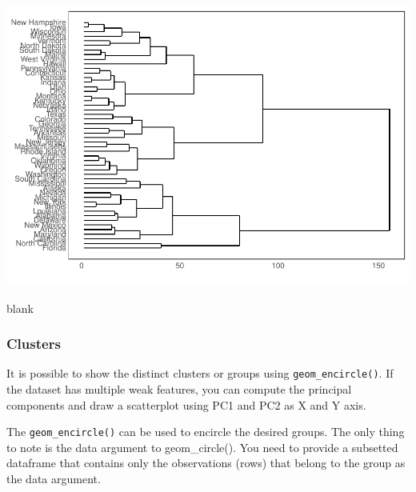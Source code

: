 \documentclass[a4paper]{article}
\begin{document}
\includegraphics{M24-ggplot2_Gallery_files/figure-latex/unnamed-chunk-54-1.pdf}

\newpage

blank

\newpage

\subsubsection{Clusters}\label{clusters}

It is possible to show the distinct clusters or groups using
\texttt{geom\_encircle()}. If the dataset has multiple weak features,
you can compute the principal components and draw a scatterplot using
PC1 and PC2 as X and Y axis.

The \texttt{geom\_encircle()} can be used to encircle the desired
groups. The only thing to note is the data argument to geom\_circle().
You need to provide a subsetted dataframe that contains only the
observations (rows) that belong to the group as the data argument.
\end{document}
